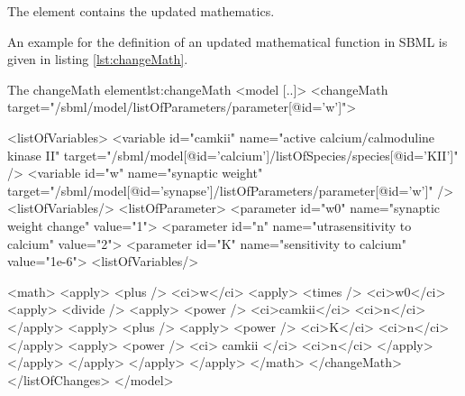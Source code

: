 The  element contains the updated mathematics. 

An example for the definition of an updated mathematical function in SBML is given in listing \ref{lst:changeMath}.
%
\begin{myXmlLst}{The changeMath element}{lst:changeMath}
<model [..]>
    <changeMath target="/sbml/model/listOfParameters/parameter[@id='w']">

      <listOfVariables>
        <variable id="camkii" name="active calcium/calmoduline kinase II" 
                  target="/sbml/model[@id='calcium']/listOfSpecies/species[@id='KII']" />
        <variable id="w" name="synaptic weight"
                  target="/sbml/model[@id='synapse']/listOfParameters/parameter[@id='w']" />
      <listOfVariables/>
      <listOfParameter>
        <parameter id="w0" name="synaptic weight change" value="1">
        <parameter id="n" name="utrasensitivity to calcium" value="2">
        <parameter id="K" name="sensitivity to calcium" value="1e-6">
      <listOfVariables/>

      <math>
         <apply>
           <plus />
           <ci>w</ci>
           <apply>
             <times />
             <ci>w0</ci>
             <apply>
               <divide />
               <apply>
                 <power />
                 <ci>camkii</ci>
                 <ci>n</ci>
               </apply>
               <apply>
                 <plus />
                 <apply>
                   <power />
                   <ci>K</ci>
                   <ci>n</ci>
                 </apply>
                 <apply>
                   <power />
                   <ci> camkii </ci>
                   <ci>n</ci>
                 </apply>
               </apply>
             </apply>
           </apply> 
         </apply>
      </math>
    </changeMath>
  </listOfChanges>
</model>
\end{myXmlLst}
%

